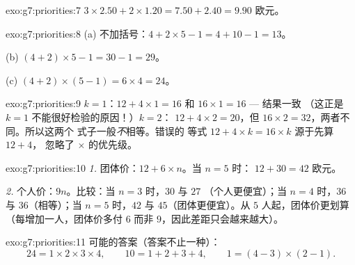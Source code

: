 \begin{solution}{exo:g7:priorities:7}
$3 \times 2.50 + 2 \times 1.20 = 7.50 + 2.40 = 9.90$ 欧元。
\end{solution}

\begin{solution}{exo:g7:priorities:8}
(a) 不加括号：$4 + 2 \times 5 - 1 = 4 + 10 - 1 = 13$。

(b) $(4 + 2) \times 5 - 1 = 30 - 1 = 29$。

(c) $(4 + 2) \times (5 - 1) = 6 \times 4 = 24$。
\end{solution}

\begin{solution}{exo:g7:priorities:9}
$k = 1$：$12 + 4 \times 1 = 16$ 和 $16 \times 1 = 16$ --- 结果一致
（这正是 $k = 1$ 不能很好检验的原因！）$k = 2$：
$12 + 4 \times 2 = 20$，但 $16 \times 2 = 32$，两者不同。所以这两个
式子一般\emph{不}相等。错误的
等式 $12 + 4 \times k = 16 \times k$ 源于先算 $12 + 4$，
忽略了 $\times$ 的优先级。
\end{solution}

\begin{solution}{exo:g7:priorities:10}
\emph{1.} 团体价：$12 + 6 \times n$。当 $n = 5$ 时：
$12 + 30 = 42$ 欧元。

\emph{2.} 个人价：$9n$。比较：当 $n = 3$ 时，$30$ 与 $27$
（个人更便宜）；当 $n = 4$ 时，$36$ 与 $36$（相等）；当 $n = 5$ 时，$42$ 与
$45$（团体更便宜）。从 $5$ 人起，团体价更划算
（每增加一人，团体价多付 $6$ 而非 $9$，因此差距只会越来越大）。
\end{solution}

\begin{solution}{exo:g7:priorities:11}
可能的答案（答案不止一种）：
\[
24 = 1 \times 2 \times 3 \times 4, \qquad
10 = 1 + 2 + 3 + 4, \qquad
1 = (4 - 3) \times (2 - 1).
\]
\end{solution}

